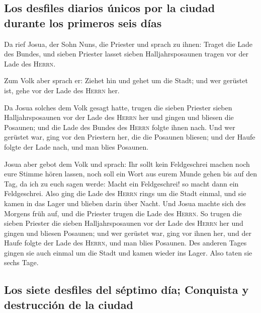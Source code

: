 \hypertarget{los-desfiles-diarios-uxfanicos-por-la-ciudad-durante-los-primeros-seis-duxedas}{%
\subsection{Los desfiles diarios únicos por la ciudad durante los
primeros seis
días}\label{los-desfiles-diarios-uxfanicos-por-la-ciudad-durante-los-primeros-seis-duxedas}}

 Da rief Josua, der Sohn Nuns, die Priester und sprach zu
ihnen: Traget die Lade des Bundes, und sieben Priester lasset sieben
Halljahrsposaunen tragen vor der Lade des \textsc{Herrn}.

 Zum Volk aber sprach er: Ziehet hin und gehet um die
Stadt; und wer gerüstet ist, gehe vor der Lade des \textsc{Herrn} her.

 Da Josua solches dem Volk gesagt hatte, trugen die sieben
Priester sieben Halljahrsposaunen vor der Lade des \textsc{Herrn} her
und gingen und bliesen die Posaunen; und die Lade des Bundes des
\textsc{Herrn} folgte ihnen nach.  Und wer gerüstet war,
ging vor den Priestern her, die die Posaunen bliesen; und der Haufe
folgte der Lade nach, und man blies Posaunen.

 Josua aber gebot dem Volk und sprach: Ihr sollt kein
Feldgeschrei machen noch eure Stimme hören lassen, noch soll ein Wort
aus eurem Munde gehen bis auf den Tag, da ich zu euch sagen werde: Macht
ein Feldgeschrei! so macht dann ein Feldgeschrei.  Also
ging die Lade des \textsc{Herrn} rings um die Stadt einmal, und sie
kamen in das Lager und blieben darin über Nacht.  Und
Josua machte sich des Morgens früh auf, und die Priester trugen die Lade
des \textsc{Herrn}.  So trugen die sieben Priester die
sieben Halljahrsposaunen vor der Lade des \textsc{Herrn} her und gingen
und bliesen Posaunen; und wer gerüstet war, ging vor ihnen her, und der
Haufe folgte der Lade des \textsc{Herrn}, und man blies Posaunen.
 Des anderen Tages gingen sie auch einmal um die Stadt
und kamen wieder ins Lager. Also taten sie sechs Tage.

\hypertarget{los-siete-desfiles-del-suxe9ptimo-duxeda-conquista-y-destrucciuxf3n-de-la-ciudad}{%
\subsection{Los siete desfiles del séptimo día; Conquista y destrucción
de la
ciudad}\label{los-siete-desfiles-del-suxe9ptimo-duxeda-conquista-y-destrucciuxf3n-de-la-ciudad}}

